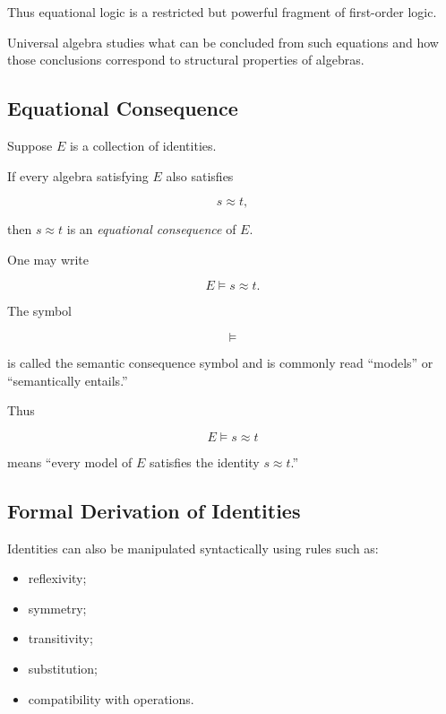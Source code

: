 Thus equational logic is a restricted but powerful fragment of first-order
logic.

Universal algebra studies what can be concluded from such equations and how
those conclusions correspond to structural properties of algebras.

\subsection{Equational Consequence}
\label{subsec:equational-consequence}

Suppose \(E\) is a collection of identities.

If every algebra satisfying \(E\) also satisfies

\[ s\approx t, \]

then \(s\approx t\) is an \emph{equational consequence} of \(E\).

One may write

\[ E\models s\approx t. \]

The symbol

\[ \models \]

is called the semantic consequence symbol and is commonly read
``models'' or ``semantically entails.''

Thus

\[ E\models s\approx t \]

means ``every model of \(E\) satisfies the identity \(s\approx t\).''

\subsection{Formal Derivation of Identities}
\label{subsec:formal-equational-derivation}

Identities can also be manipulated syntactically using rules such as:

\begin{itemize}
    \item reflexivity;
    \item symmetry;
    \item transitivity;
    \item substitution;
    \item compatibility with operations.
\end{itemize}

